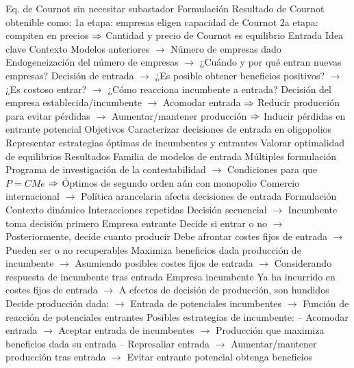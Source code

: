 \documentclass{nuevotema}
\begin{document}
\begin{esquemal}
				\4[] Eq. de Cournot sin necesitar subastador
				\4 Formulación
				\4[] Resultado de Cournot obtenible como:
				\4[] 1a etapa: empresas eligen capacidad de Cournot
				\4[] 2a etapa: compiten en precios
				\4[] $\Rightarrow$ Cantidad y precio de Cournot es equilibrio
		\2 Entrada
			\3 Idea clave
				\4 Contexto
				\4[] Modelos anteriores
				\4[] $\to$ Número de empresas dado
				\4[] Endogeneización del número de empresas
				\4[] $\to$ ¿Cuándo y por qué entran nuevas empresas?
				\4[] Decisión de entrada
				\4[] $\to$ ¿Es posible obtener beneficios positivos?
				\4[] $\to$ ¿Es costoso entrar?
				\4[] $\to$ ¿Cómo reacciona incumbente a entrada?
				\4[] Decisión del empresa establecida/incumbente
				\4[] $\to$ Acomodar entrada
				\4[] $\Rightarrow$ Reducir producción para evitar pérdidas
				\4[] $\to$ Aumentar/mantener producción
				\4[] $\Rightarrow$ Inducir pérdidas en entrante potencial
				\4[]
				\4 Objetivos
				\4[] Caracterizar decisiones de entrada en oligopolios
				\4[] Representar estrategias óptimas de incumbentes y entrantes
				\4[] Valorar optimalidad de equilibrios
				\4 Resultados
				\4[] Familia de modelos de entrada
				\4[] Múltiples formulación
				\4[] Programa de investigación de la contestabilidad
				\4[] $\to$ Condiciones para que $P=CMe$
				\4[] $\Rightarrow$ Óptimos de segundo orden aún con monopolio
				\4[] Comercio internacional
				\4[] $\to$ Política arancelaria afecta decisiones de entrada
				\4[]
			\3 Formulación
				\4 Contexto dinámico
				\4[] Interacciones repetidas
				\4[] Decisión secuencial
				\4[] $\to$ Incumbente toma decisión primero
				\4 Empresa entrante
				\4[] Decide si entrar o no
				\4[] $\to$ Posteriormente, decide cuanto producir
				\4[] Debe afrontar costes fijos de entrada
				\4[] $\to$ Pueden ser o no recuperables
				\4[] Maximiza beneficios dada producción de incumbente
				\4[] $\to$ Asumiendo posibles costes fijos de entrada
				\4[] $\to$ Considerando respuesta de incumbente tras entrada
				\4 Empresa incumbente
				\4[] Ya ha incurrido en costes fijos de entrada
				\4[] $\to$ A efectos de decisión de producción, son hundidos
				\4[] Decide producción dada:
				\4[] $\to$ Entrada de potenciales incumbentes
				\4[] $\to$ Función de reacción de potenciales entrantes
				\4[] Posibles estrategias de incumbente:
				\4[] -- Acomodar entrada
				\4[] $\to$ Aceptar entrada de incumbentes
				\4[] $\to$ Producción que maximiza beneficios dada su entrada
				\4[] -- Represaliar entrada
				\4[] $\to$ Aumentar/mantener producción tras entrada
				\4[] $\to$ Evitar entrante potencial obtenga beneficios

\end{esquemal}
\end{document}
